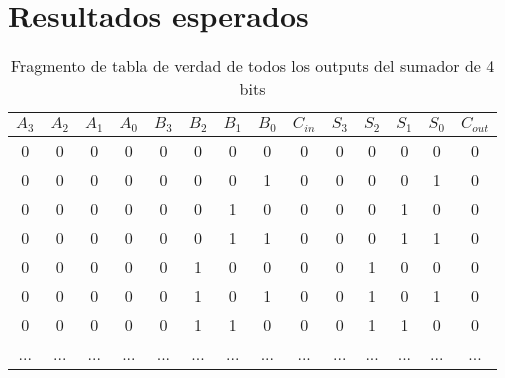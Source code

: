 \documentclass{article}
\begin{document}
\section{Resultados esperados}\label{sec:resEsperados}
\begin{table}[H]
\centering	
\begin{tabular}{|c|c|c|c|c|c|c|c|c|c|c|c|c|c|}
\hline
$A_3$ & $A_2$ & $A_1$ & $A_0$ & $B_3$ & $B_2$ & $B_1$ & $B_0$ & $C_{in}$ & $S_3$ & $S_2$ & $S_1$ & $S_0$ & $C_{out}$\\
\hline
0 & 0 & 0 & 0 & 0 & 0 & 0 & 0 & 0 & 0 & 0 & 0 & 0 & 0\\
\hline
0 & 0 & 0 & 0 & 0 & 0 & 0 & 1 & 0 & 0 & 0 & 0 & 1 & 0\\
\hline
0 & 0 & 0 & 0 & 0 & 0 & 1 & 0 & 0 & 0 & 0 & 1 & 0 & 0\\
\hline
0 & 0 & 0 & 0 & 0 & 0 & 1 & 1 & 0 & 0 & 0 & 1 & 1 & 0\\
\hline
0 & 0 & 0 & 0 & 0 & 1 & 0 & 0 & 0 & 0 & 1 & 0 & 0 & 0\\
\hline
0 & 0 & 0 & 0 & 0 & 1 & 0 & 1 & 0 & 0 & 1 & 0 & 1 & 0\\
\hline
0 & 0 & 0 & 0 & 0 & 1 & 1 & 0 & 0 & 0 & 1 & 1 & 0 & 0\\
\hline
... & ... & ... & ... & ... & ... & ... & ... & ... & ... & ... & ... & ... & ... \\
\hline
\end{tabular}
\caption{Fragmento de tabla de verdad de todos los outputs del sumador de 4 bits}
\label{table:1}
\end{table}
\end{document}
